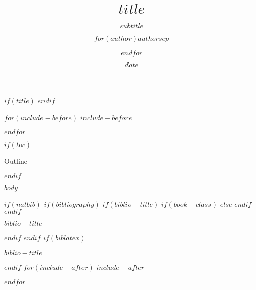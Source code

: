 \documentclass[
    $if(fontsize)$$fontsize$,$endif$%
    $if(beamer)$ignorenonframetext,$endif$%
    $for(classoption)$$classoption$$sep$,$endfor$]{$documentclass$}
\title{$title$}
\subtitle{$subtitle$}
\author{$for(author)$$author$$sep$ \and $endfor$}
\institute{$for(institute)$$institute$$sep$ \and $endfor$}
\date{$date$}
\begin{document}
$if(title)$
\frame{\titlepage}
$endif$

$for(include-before)$
$include-before$

$endfor$

$if(toc)$
\begin{frame}[shrink]{Outline}
\tableofcontents[hideallsubsections]
\end{frame}
$endif$

$body$

$if(natbib)$
$if(bibliography)$
$if(biblio-title)$
$if(book-class)$
\renewcommand\bibname{$biblio-title$}
$else$
\renewcommand\refname{$biblio-title$}
$endif$
$endif$
\begin{frame}[allowframebreaks]{$biblio-title$}

\end{frame}

$endif$
$endif$
$if(biblatex)$
\begin{frame}[allowframebreaks]{$biblio-title$}
\printbibliography[heading=none]
\end{frame}

$endif$
$for(include-after)$
$include-after$

$endfor$
\end{document}

